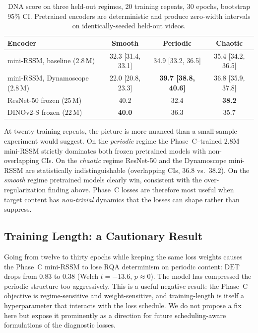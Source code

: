 \documentclass[11pt,a4paper]{article}
\begin{document}
\begin{table}[h]
\centering
\caption{DNA score on three held-out regimes, 20 training repeats,
30 epochs, bootstrap 95\% CI. Pretrained encoders are deterministic
and produce zero-width intervals on identically-seeded held-out videos.}
\label{tab:baselines}
\begin{tabular}{lccc}
\toprule
Encoder & Smooth & Periodic & Chaotic \\
\midrule
mini-RSSM, baseline (2.8\,M) & 32.3 [31.4, 33.1] & 34.9 [33.2, 36.5] & 35.4 [34.2, 36.5] \\
mini-RSSM, Dynamoscope (2.8\,M) & 22.0 [20.8, 23.3] & \textbf{39.7 [38.8, 40.6]} & 36.8 [35.9, 37.8] \\
ResNet-50 frozen (25\,M) & 40.2 & 32.4 & \textbf{38.2} \\
DINOv2-S frozen (22\,M) & \textbf{40.0} & 36.3 & 35.7 \\
\bottomrule
\end{tabular}
\end{table}

At twenty training repeats, the picture is more nuanced than a
small-sample experiment would suggest. On the \emph{periodic} regime
the Phase~C--trained 2.8M mini-RSSM strictly dominates both frozen
pretrained models with non-overlapping CIs. On the \emph{chaotic}
regime ResNet-50 and the Dynamoscope mini-RSSM are statistically
indistinguishable (overlapping CIs, $36.8$ vs.\ $38.2$). On the
\emph{smooth} regime pretrained models clearly win, consistent with
the over-regularization finding above. Phase~C losses are therefore
most useful when target content has \emph{non-trivial} dynamics
that the losses can shape rather than suppress.

\subsection{Training Length: a Cautionary Result}

Going from twelve to thirty epochs while keeping the same loss
weights causes the Phase~C mini-RSSM to lose RQA determinism on
periodic content: $\mathrm{DET}$ drops from $0.83$ to $0.38$
(Welch $t=-13.6$, $p \approx 0$). The model has compressed the
periodic structure too aggressively. This is a useful negative
result: the Phase~C objective is regime-sensitive and weight-sensitive,
and training-length is itself a hyperparameter that interacts with
the loss schedule. We do not propose a fix here but expose it
prominently as a direction for future scheduling-aware
formulations of the diagnostic losses.
\end{document}

